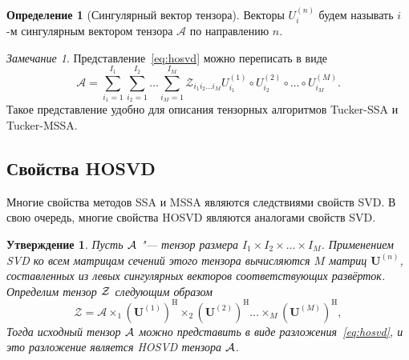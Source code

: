 \documentclass[specialist,
  substylefile = spbu.rtx,
subf,href,colorlinks=true, 12pt]{disser}
\theoremstyle{plain}
\newtheorem{statement}{Утверждение}[section]
\theoremstyle{definition}
\newtheorem{definition}{Определение}[section]
\theoremstyle{remark}
\newtheorem{remark}{Замечание}[section]
\def\tssa/{Tucker-SSA}
\def\tmssa/{Tucker-MSSA}
\begin{document}
\begin{definition}[Сингулярный вектор тензора]
  \label{def:singular-tensor}
  Векторы $U_i^{(n)}$ будем называть $i$-м сингулярным вектором
  тензора $\mathcal A$ по направлению $n$.
\end{definition}
\begin{remark}
  Представление~\eqref{eq:hosvd} можно переписать в виде
  \begin{equation}
    \mathcal{A}=\sum_{i_1=1}^{I_1} \sum_{i_2=1}^{I_2}\ldots
    \sum_{i_M=1}^{I_M} \mathcal{Z}_{i_1 i_2 \ldots i_M}
    U^{(1)}_{i_1} \circ U^{(2)}_{i_2} \circ \ldots\circ
    U^{(M)}_{i_M}.\label{eq:sum-hosvd}
  \end{equation}
  Такое представление удобно для описания тензорных алгоритмов \tssa/
  и \tmssa/.
\end{remark}

\subsection{Свойства HOSVD}\label{subsec:hosvd-properties}
Многие свойства методов SSA и MSSA являются следствиями свойств SVD.
В свою очередь, многие свойства HOSVD являются аналогами свойств SVD.

\begin{statement}
  Пусть $\mathcal{A}$ "--- тензор размера $I_1\times I_2\times\ldots\times I_M$.
  Применением SVD ко всем матрицам сечений этого тензора вычисляются
  $M$ матриц $\mathbf{U}^{(n)}$, составленных из левых сингулярных
  векторов соответствующих развёрток. Определим тензор $\mathcal{Z}$
  следующим образом
  \[
    \mathcal{Z}=\mathcal{A}\times_1
    \left(\mathbf{U}^{(1)}\right)^\mathrm{H}\times_2
    \left(\mathbf{U}^{(2)}\right)^\mathrm{H}\ldots \times_M
    \left(\mathbf{U}^{(M)}\right)^\mathrm{H},
  \]
  Тогда исходный тензор $\mathcal{A}$ можно представить в
  виде разложения~\eqref{eq:hosvd}, и это разложение является
  HOSVD тензора $\mathcal{A}$.
  \label{state:hosvd-to-svd}
\end{statement}
\end{document}
